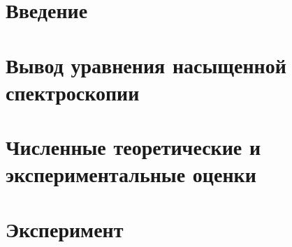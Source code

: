 


\section{Введение}


\newpage

\section{Вывод уравнения насыщенной спектроскопии}





\newpage


\section{Численные теоретические и экспериментальные оценки}


\newpage


\section{Эксперимент}
